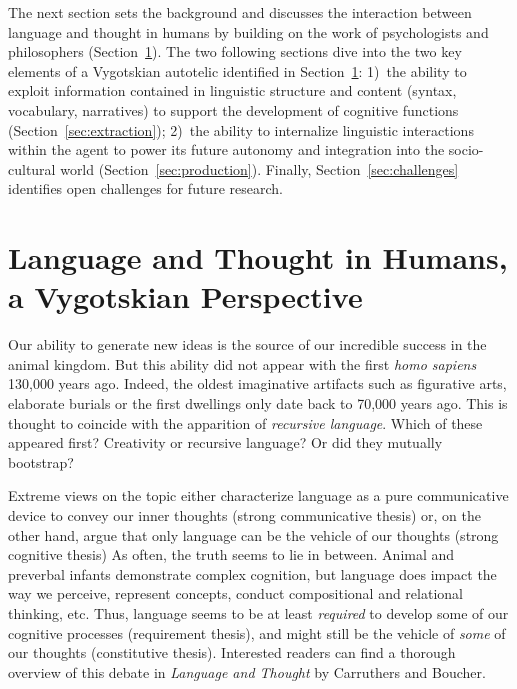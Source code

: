 The next section sets the background and discusses the interaction between language and thought in humans by building on the work of psychologists and philosophers (Section~\ref{sec:4views}). The two following sections dive into the two key elements of a Vygotskian autotelic \ai identified in Section~\ref{sec:4views}: 1)~the ability to exploit information contained in linguistic structure and content (syntax, vocabulary, narratives) to support the development of cognitive functions (Section~\ref{sec:extraction}); 2)~the ability to internalize linguistic interactions within the agent to power its future autonomy and integration into the socio-cultural world (Section~\ref{sec:production}). Finally, Section~\ref{sec:challenges} identifies open challenges for future research.



\section{Language and Thought in Humans, a Vygotskian Perspective}
\label{sec:4views}
Our ability to generate new ideas is the source of our incredible success in the animal kingdom. But this ability did not appear with the first \textit{homo sapiens} 130,000 years ago. Indeed, the oldest imaginative artifacts such as figurative arts, elaborate burials or the first dwellings only date back to 70,000 years ago.\cite{harari_sapiens_2014, vyshedskiy_language_2019} This is thought to coincide with the apparition of \textit{recursive language}.\cite{goldberg1999emergence, vyshedskiy_language_2019, hoffmann_construction_2020} Which of these appeared first? Creativity or recursive language? Or did they mutually bootstrap?

Extreme views on the topic either characterize language as a pure communicative device to convey our inner thoughts (strong communicative thesis)\cite{chomsky_syntactic_1957,fodor1975language} or, on the other hand, argue that only language can be the vehicle of our thoughts (strong cognitive thesis)\cite{wittgenstein1953philosophical, mcdowell1996mind} As often, the truth seems to lie in between. Animal and preverbal infants demonstrate complex cognition,\cite{sperber1995causal, allen1999species} but language does impact the way we perceive,\cite{waxman_words_1995, yoshida_sound_2003} represent concepts,\cite{lakoff2008metaphors} conduct compositional and relational thinking,\cite{gentner2002relational, gentner_analogy_2017, vyshedskiy_language_2019} etc. Thus, language seems to be at least \textit{required} to develop some of our cognitive processes (requirement thesis), and might still be the vehicle of \textit{some} of our thoughts (constitutive thesis).\cite{carruthers_language_1998} Interested readers can find a thorough overview of this debate in \textit{Language and Thought} by Carruthers and Boucher.\cite{carruthers_language_1998}

